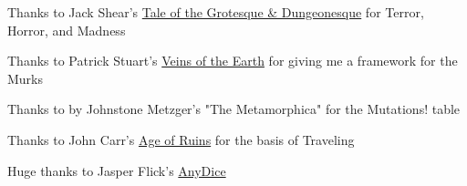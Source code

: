 {{  \item Thanks to Jack Shear's \href{http://talesofthegrotesqueanddungeonesque.blogspot.com}{Tale of the Grotesque \& Dungeonesque} for Terror, Horror, and Madness

  \item Thanks to Patrick Stuart's \href{http://www.lotfp.com/store/index.php?route=product/product\&product_id=262}{Veins of the Earth} for giving me a framework for the Murks

  \item Thanks to by Johnstone Metzger's "The Metamorphica" for the Mutations! table

  \item Thanks to John Carr's \href{https://ageofruins.wordpress.com/2012/10/18/deck-of-many-threats-wilderness-encounters-based-on-playing-cards-plus-a-simple-system-for-provisions/}{Age of Ruins} for the basis of Traveling 

  \item Huge thanks to Jasper Flick's \href{https://anydice.com}{AnyDice}
}





}

